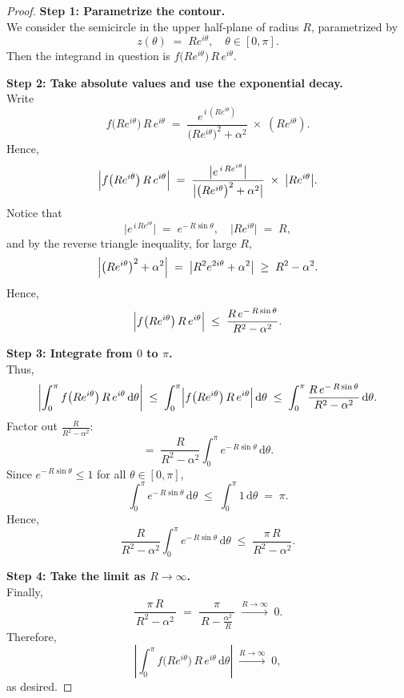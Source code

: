 \documentclass[12pt]{article}
\theoremstyle{definition} %
\theoremstyle{plain} %
\begin{document}
\begin{proof}
\textbf{Step 1: Parametrize the contour.}\\
We consider the semicircle in the upper half-plane of radius $R$, parametrized by 
\[
z(\theta) \;=\; R e^{i\theta},
\quad
\theta \in [0,\pi].
\]
Then the integrand in question is $f\bigl(Re^{i\theta}\bigr)\,R\,e^{i\theta}$.

\bigskip
\noindent
\textbf{Step 2: Take absolute values and use the exponential decay.}\\
Write 
\[
f\bigl(Re^{i\theta}\bigr)\,R\,e^{i\theta}
\;=\;
\frac{e^{\,i\,(R e^{i\theta})}}{\bigl(Re^{i\theta}\bigr)^2 + \alpha^2}
\;\times\;(R e^{i\theta}).
\]
Hence,
\[
\Bigl| f\bigl(Re^{i\theta}\bigr)\,R\,e^{i\theta}\Bigr|
\;=\;
\frac{\bigl| e^{\,i\,R e^{i\theta}}\bigr|}
{\bigl|\bigl(Re^{i\theta}\bigr)^2 + \alpha^2\bigr|}
\;\times\; \bigl| R e^{i\theta}\bigr|.
\]
Notice that
\[
\bigl| e^{\,i\,R e^{i\theta}}\bigr|
\;=\;
e^{-\,R\sin\theta},
\quad
\bigl| R e^{i\theta}\bigr|
\;=\;
R,
\]
and by the reverse triangle inequality, for large $R$,
\[
\Bigl|\bigl(Re^{i\theta}\bigr)^2 + \alpha^2\Bigr|
\;=\;
\bigl|R^2 e^{2i\theta} + \alpha^2\bigr|
\;\ge\;
R^2 - \alpha^2.
\]
Hence,
\[
\Bigl| f\bigl(Re^{i\theta}\bigr)\,R\,e^{i\theta}\Bigr|
\;\le\;
\frac{R\, e^{-\,R\sin\theta}}{R^2 - \alpha^2}.
\]

\bigskip
\noindent
\textbf{Step 3: Integrate from $0$ to $\pi$.}\\
Thus,
\[
\left|
\int_{0}^{\pi} f\bigl(Re^{i\theta}\bigr)\,R\,e^{i\theta}\,\mathrm{d}\theta
\right|
\;\le\;
\int_{0}^{\pi}
\Bigl| f\bigl(Re^{i\theta}\bigr)\,R\,e^{i\theta}\Bigr|
\,\mathrm{d}\theta
\;\le\;
\int_{0}^{\pi} \frac{R\, e^{-\,R\sin\theta}}{R^2 - \alpha^2}
\,\mathrm{d}\theta.
\]
Factor out $\displaystyle \frac{R}{R^2 - \alpha^2}$:
\[
=\;
\frac{R}{R^2 - \alpha^2}
\int_{0}^{\pi}
e^{-\,R\sin\theta}
\,\mathrm{d}\theta.
\]
Since $e^{-\,R\sin\theta} \le 1$ for all $\theta \in [0,\pi]$,
\[
\int_{0}^{\pi} e^{-\,R\sin\theta}
\,\mathrm{d}\theta
\;\le\;
\int_{0}^{\pi} 1 \,\mathrm{d}\theta
\;=\;
\pi.
\]
Hence,
\[
\frac{R}{R^2 - \alpha^2}
\int_{0}^{\pi}
e^{-\,R\sin\theta}
\,\mathrm{d}\theta
\;\le\;
\frac{\pi\,R}{R^2 - \alpha^2}.
\]

\bigskip
\noindent
\textbf{Step 4: Take the limit as $R\to\infty$.}\\
Finally,
\[
\frac{\pi\,R}{\,R^2 - \alpha^2\,}
\;=\;
\frac{\pi}{\,R - \tfrac{\alpha^2}{R}\,}
\;\xrightarrow{R\to\infty}\;
0.
\]
Therefore,
\[
\left|
\int_{0}^{\pi} f\bigl(Re^{i\theta}\bigr)\,R\,e^{i\theta}
\,\mathrm{d}\theta
\right|
\;\xrightarrow{R\to\infty}\;0,
\]
as desired.
\end{proof}
\end{document}
